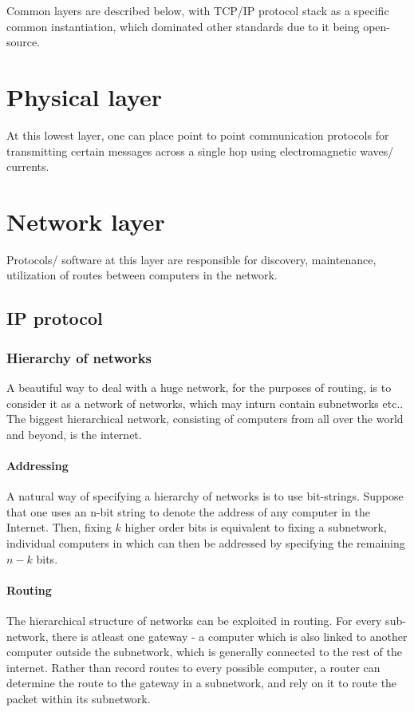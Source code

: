 \documentclass[oneside, article]{memoir}
\begin{document}
Common layers are described below, with TCP/IP protocol stack as a specific common instantiation, which dominated other standards due to it being open-source.

\section{Physical layer}
At this lowest layer, one can place point to point communication protocols for transmitting certain messages across a single hop using electromagnetic waves/ currents.

\section{Network layer}
Protocols/ software at this layer are responsible for discovery, maintenance, utilization of routes between computers in the network.

\subsection{IP protocol}
\subsubsection{Hierarchy of networks}
A beautiful way to deal with a huge network, for the purposes of routing, is to consider it as a network of networks, which may inturn contain subnetworks etc.. The biggest hierarchical network, consisting of computers from all over the  world and beyond, is the internet.

\paragraph{Addressing}
A natural way of specifying a hierarchy of networks is to use bit-strings. Suppose that one uses an n-bit string to denote the address of any computer in the Internet. Then, fixing $k$ higher order bits is equivalent to fixing a subnetwork, individual computers in which can then be addressed by specifying the remaining $n-k$ bits.

\paragraph{Routing}
The hierarchical structure of networks can be exploited in routing. For every sub-network, there is atleast one gateway - a computer which is also linked to another computer outside the subnetwork, which is generally connected to the rest of the internet. Rather than record routes to every possible computer, a router can determine the route to the gateway in a subnetwork, and rely on it to route the packet within its subnetwork.
\end{document}
